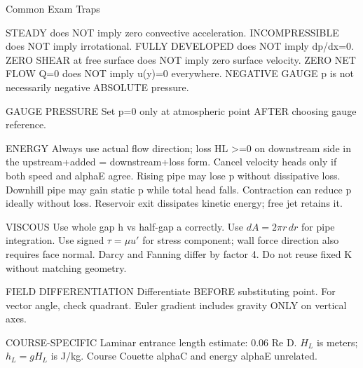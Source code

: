 Common Exam Traps

STEADY does NOT imply zero convective acceleration.
INCOMPRESSIBLE does NOT imply irrotational.
FULLY DEVELOPED does NOT imply dp/dx=0.
ZERO SHEAR at free surface does NOT imply zero surface velocity.
ZERO NET FLOW Q=0 does NOT imply u(y)=0 everywhere.
NEGATIVE GAUGE p is not necessarily negative ABSOLUTE pressure.

GAUGE PRESSURE
Set p=0 only at atmospheric point AFTER choosing gauge reference.

ENERGY
Always use actual flow direction; loss HL >=0 on downstream side in the upstream+added = downstream+loss form.
Cancel velocity heads only if both speed and alphaE agree.
Rising pipe may lose p without dissipative loss.
Downhill pipe may gain static p while total head falls.
Contraction can reduce p ideally without loss.
Reservoir exit dissipates kinetic energy; free jet retains it.

VISCOUS
Use whole gap h vs half-gap a correctly.
Use $dA=2\pi r\,dr$ for pipe integration.
Use signed $\tau=\mu u'$ for stress component; wall force direction also requires face normal.
Darcy and Fanning differ by factor 4.
Do not reuse fixed K without matching geometry.

FIELD DIFFERENTIATION
Differentiate BEFORE substituting point.
For vector angle, check quadrant.
Euler gradient includes gravity ONLY on vertical axes.

COURSE-SPECIFIC
Laminar entrance length estimate: 0.06 Re D.
$H_L$ is meters; $h_L=gH_L$ is J/kg.
Course Couette alphaC and energy alphaE unrelated.
